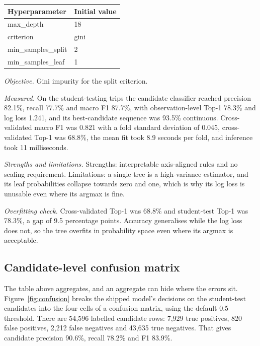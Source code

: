 \documentclass[11pt,a4paper]{article}
\begin{document}
\begin{center}\small\begin{tabular}{@{}ll@{}}\toprule\textbf{Hyperparameter} & \textbf{Initial value} \\ \midrule
max\_depth & 18 \\
criterion & gini \\
min\_samples\_split & 2 \\
min\_samples\_leaf & 1 \\
\bottomrule\end{tabular}\end{center}

\noindent\textit{Objective.} Gini impurity for the split criterion.

\noindent\textit{Measured.} On the student-testing trips the candidate classifier reached precision 82.1\%, recall 77.7\% and macro F1 87.7\%, with observation-level Top-1 78.3\% and log loss 1.241, and its best-candidate sequence was 93.5\% continuous. Cross-validated macro F1 was 0.821 with a fold standard deviation of 0.045, cross-validated Top-1 was 68.8\%, the mean fit took 8.9 seconds per fold, and inference took 11 milliseconds.

\noindent\textit{Strengths and limitations.} Strengths: interpretable axis-aligned rules and no scaling requirement. Limitations: a single tree is a high-variance estimator, and its leaf probabilities collapse towards zero and one, which is why its log loss is unusable even where its argmax is fine.

\noindent\textit{Overfitting check.} Cross-validated Top-1 was 68.8\% and student-test Top-1 was 78.3\%, a gap of 9.5 percentage points. Accuracy generalises while the log loss does not, so the tree overfits in probability space even where its argmax is acceptable.


\subsection{Candidate-level confusion matrix}

The table above aggregates, and an aggregate can hide where the errors sit. Figure~\ref{fig:confusion}
breaks the shipped model's decisions on the student-test candidates into the four cells of a confusion
matrix, using the default 0.5 threshold. There are 54,596 labelled candidate rows: 7,929 true positives, 820 false positives, 2,212 false negatives and 43,635 true negatives. That gives candidate precision 90.6\%, recall 78.2\% and F1 83.9\%.
\end{document}
